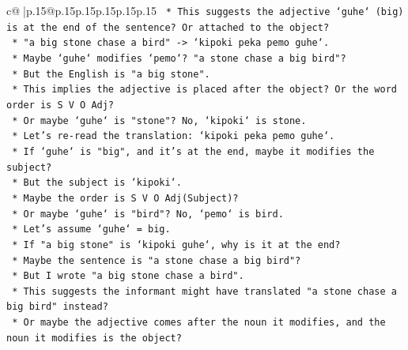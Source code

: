 \documentclass{article}
\begin{document}
{\begin{supertabular}{c@{$\;$}|p{.15\linewidth}@{}p{.15\linewidth}p{.15\linewidth}p{.15\linewidth}p{.15\linewidth}p{.15\linewidth}}
{{{\texttt{                                        *   This suggests the adjective `guhe` (big) is at the end of the sentence? Or attached to the object?} \\
\texttt{                                        *   "a big stone chase a bird" {-}> `kipoki peka pemo guhe`.} \\
\texttt{                                        *   Maybe `guhe` modifies `pemo`? "a stone chase a big bird"?} \\
\texttt{                                        *   But the English is "a big stone".} \\
\texttt{                                        *   This implies the adjective is placed after the object? Or the word order is S V O Adj?} \\
\texttt{                                        *   Or maybe `guhe` is "stone"? No, `kipoki` is stone.} \\
\texttt{                                        *   Let's re{-}read the translation: `kipoki peka pemo guhe`.} \\
\texttt{                                        *   If `guhe` is "big", and it's at the end, maybe it modifies the subject?} \\
\texttt{                                        *   But the subject is `kipoki`.} \\
\texttt{                                        *   Maybe the order is S V O Adj(Subject)?} \\
\texttt{                                        *   Or maybe `guhe` is "bird"? No, `pemo` is bird.} \\
\texttt{                                        *   Let's assume `guhe` = big.} \\
\texttt{                                        *   If "a big stone" is `kipoki guhe`, why is it at the end?} \\
\texttt{                                        *   Maybe the sentence is "a stone chase a big bird"?} \\
\texttt{                                        *   But I wrote "a big stone chase a bird".} \\
\texttt{                                        *   This suggests the informant might have translated "a stone chase a big bird" instead?} \\
\texttt{                                        *   Or maybe the adjective comes after the noun it modifies, and the noun it modifies is the object?} \\
}}}
\end{supertabular}}
\end{document}
